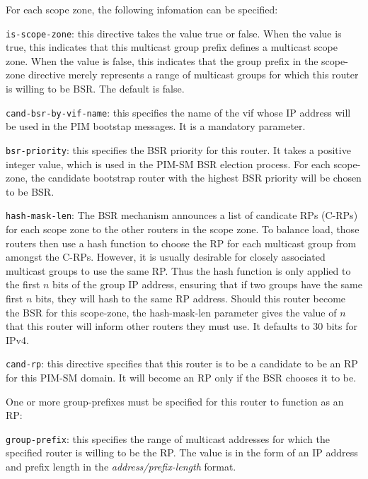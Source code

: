 \begin{description}
\begin{description}
\begin{description}
  For each scope zone, the following infomation can be specified: 
\begin{description}
\item{\tt is-scope-zone}: this directive takes the value {\stt true}
  or {\stt false}.  When the value is {\stt true}, this indicates that
  this multicast group prefix defines a multicast scope zone.  When
  the value is {\stt false}, this indicates that the group prefix in
  the {\stt scope-zone} directive merely represents a range of
  multicast groups for which this router is willing to be BSR.  The
  default is {\stt false}.
\item{\tt cand-bsr-by-vif-name}: this specifies the name of the {\stt
  vif} whose IP address will be used in the PIM bootstap messages.  It
  is a mandatory parameter.
\item{\tt bsr-priority}: this specifies the BSR priority for this
  router.  It takes a positive integer value, which is used in the
  PIM-SM BSR election process.  For each {\stt scope-zone}, the
  candidate bootstrap router with the highest BSR priority will be
  chosen to be BSR.
\item{\tt hash-mask-len}: The BSR mechanism announces a list of
  candicate RPs (C-RPs) for each scope zone to the other routers in
  the scope zone.  To balance load, those routers then use a hash
  function to choose the RP for each multicast group from amongst the
  C-RPs.  However, it is usually desirable for closely associated
  multicast groups to use the same RP.  Thus the hash function is only
  applied to the first $n$ bits of the group IP address, ensuring that
  if two groups have the same first $n$ bits, they will hash to the
  same RP address.  Should this router become the BSR for this
  scope-zone, the {\stt hash-mask-len} parameter gives the value of
  $n$ that this router will inform other routers they must use.  It
  defaults to 30 bits for IPv4.
\end{description}
\end{description}
\end{description}
\item{\tt cand-rp}: this directive specifies that this router is to be
  a candidate to be an RP for this PIM-SM domain.  It will become an
  RP only if the BSR chooses it to be.  

  One or more group-prefixes must be specified for this router
  to function as an RP:
\begin{description}
\item{\tt group-prefix}: this specifies the range of multicast
  addresses for which the specified router is willing to be the RP.
  The value is in the form of an IP address and prefix length in the
  {\it address/prefix-length} format.  


\end{description}
\end{description}
